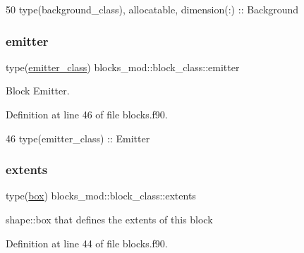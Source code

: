 \begin{DoxyCode}
50         \textcolor{keywordtype}{type}(background\_class), \textcolor{keywordtype}{allocatable}, \textcolor{keywordtype}{dimension(:)} :: Background
\end{DoxyCode}
\mbox{\label{structblocks__mod_1_1block__class_a55e85183ba871abcaba1c00d5393611f}} 
\subsubsection{\texorpdfstring{emitter}{emitter}}
{\footnotesize\ttfamily type(\mbox{\hyperlink{structemitter__mod_1_1emitter__class}{emitter\+\_\+class}}) blocks\+\_\+mod\+::block\+\_\+class\+::emitter\hspace{0.3cm}{\ttfamily [private]}}



Block Emitter. 



Definition at line 46 of file blocks.\+f90.


\begin{DoxyCode}
46         \textcolor{keywordtype}{type}(emitter\_class)    :: Emitter
\end{DoxyCode}
\mbox{\label{structblocks__mod_1_1block__class_aff3b0cb7d8248f8a87691a028de916d3}} 
\subsubsection{\texorpdfstring{extents}{extents}}
{\footnotesize\ttfamily type(\mbox{\hyperlink{structgeometry__mod_1_1box}{box}}) blocks\+\_\+mod\+::block\+\_\+class\+::extents\hspace{0.3cm}{\ttfamily [private]}}



shape\+::box that defines the extents of this block 



Definition at line 44 of file blocks.\+f90.


